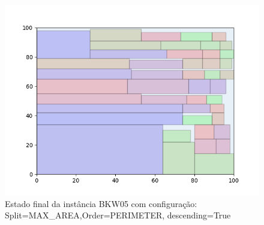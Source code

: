\begin{figure}[H]
    \centering
    \caption[]{Estado final da instância BKW05 com configuração: Split=MAX_AREA,Order=PERIMETER, descending=True}
    \label{fig:bkw05-max_area-perimeter-true}
    \includegraphics[scale=0.5]{output/figures/bkw/bkw05/max_area/perimeter/true/00}
\end{figure}